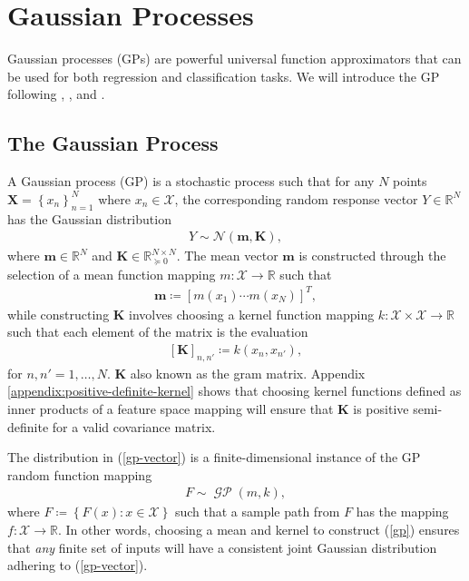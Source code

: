 \documentclass{article}
\newcommand{\GP}{\operatorname{\mathcal{GP}}}
\numberwithin{equation}{section}
\begin{document}
\newpage
\section{Gaussian Processes}\label{section:gaussian-processes}
Gaussian processes (GPs) are powerful universal function approximators that can be used for both regression and classification tasks. We will introduce the GP following \cite{rasmussen2003gaussian}, \cite{matthews2017scalable}, and \cite{wild2022generalized}.

\subsection{The Gaussian Process}\label{section:the-gp}
A Gaussian process (GP) is a stochastic process such that for any $N$ points $\mathbf{X} = \left\{ x_n\right\}_{n=1}^N$ where $x_n \in \mathcal{X}$, the corresponding random response vector $Y \in \mathbb{R}^N$ has the Gaussian distribution
\begin{align}
    \label{gp-vector}
    Y \sim \mathcal{N}\left(\mathbf{m}, \mathbf{K}\right),
\end{align}
where $\mathbf{m} \in \mathbb{R}^N$ and $\mathbf{K} \in  \mathbb{R}^{N \times N}_{\succcurlyeq 0}$.
The mean vector $\mathbf{m}$ is constructed through the selection of a mean function mapping $m: \mathcal{X} \rightarrow \mathbb{R}$ such that
\begin{align}
    \label{gp-mean-vector}
    \mathbf{m} \coloneqq \left[ m(x_1) \cdots m(x_N)\right]^T,
\end{align}
while constructing $\mathbf{K}$ involves choosing a kernel function mapping $k: \mathcal{X} \times \mathcal{X} \rightarrow \mathbb{R}$ such that each element of the matrix is the evaluation
\begin{align}
    \label{gp-kernel-matrix}
    \left[\mathbf{K}\right]_{n, n'} \coloneqq k(x_n, x_{n'}),
\end{align}
for $n, n'=1,\dots, N$. 
$\mathbf{K}$ also known as the gram matrix. 
Appendix \ref{appendix:positive-definite-kernel} shows that choosing kernel functions defined as inner products of a feature space mapping will ensure that $\mathbf{K}$ is positive semi-definite for a valid covariance matrix.


The distribution in (\ref{gp-vector}) is a finite-dimensional instance of the GP random function mapping
\begin{align}
    F \sim \GP(m, k),
    \label{gp}
\end{align}
 where $F \coloneqq \left\{F(x): x \in \mathcal{X}\right\}$ such that a sample path from $F$ has the mapping $f: \mathcal{X} \rightarrow \mathbb{R}$.
In other words, choosing a mean and kernel to construct (\ref{gp}) ensures that \textit{any} finite set of inputs will have a consistent joint Gaussian distribution adhering to (\ref{gp-vector}).
\end{document}
